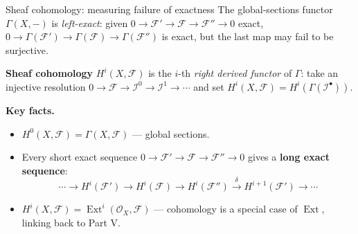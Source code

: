 \documentclass[aspectratio=169,12pt]{beamer}
\begin{document}

\begin{frame}{Sheaf cohomology: measuring failure of exactness}
  The global-sections functor $\Gamma(X, -)$ is \emph{left-exact}:
  given $0 \to \mathcal{F}' \to \mathcal{F} \to \mathcal{F}'' \to 0$ exact,
  $0 \to \Gamma(\mathcal{F}') \to \Gamma(\mathcal{F}) \to \Gamma(\mathcal{F}'')$
  is exact, but the last map may fail to be surjective.

  \smallskip

  \textbf{Sheaf cohomology} $H^i(X, \mathcal{F})$ is the $i$-th
  \emph{right derived functor} of $\Gamma$: take an injective resolution
  $0 \to \mathcal{F} \to \mathcal{I}^0 \to \mathcal{I}^1 \to \cdots$
  and set $H^i(X, \mathcal{F}) = H^i(\Gamma(\mathcal{I}^\bullet))$.

  \smallskip

  \textbf{Key facts.}
  \begin{itemize}
    \item $H^0(X, \mathcal{F}) = \Gamma(X, \mathcal{F})$ — global sections.
    \item Every short exact sequence $0 \to \mathcal{F}' \to \mathcal{F}
          \to \mathcal{F}'' \to 0$ gives a \textbf{long exact sequence}:
    \[
      \cdots \to H^{i}(\mathcal{F}') \to H^{i}(\mathcal{F})
              \to H^{i}(\mathcal{F}'') \xrightarrow{\delta}
              H^{i+1}(\mathcal{F}') \to \cdots
    \]
    \item $H^i(X, \mathcal{F}) = \operatorname{Ext}^i(\mathcal{O}_X, \mathcal{F})$
          — cohomology is a special case of $\operatorname{Ext}$,
          linking back to Part V.
  \end{itemize}
\end{frame}
\end{document}
